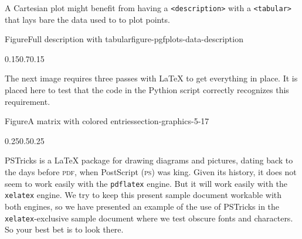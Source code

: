 \documentclass[pdflatex]{sn-jnl}
\theoremstyle{thmstyleone}%
\theoremstyle{thmstyletwo}%
\theoremstyle{thmstylethree}%
\newcommand{\mono}[1]{\texttt{#1}}
\newcommand{\initialism}[1]{\textsc{\MakeLowercase{#1}}}
\numberwithin{equation}{section}
\newcommand{\amp}{&}
\begin{document}
A Cartesian plot might benefit from having a \mono{<description>} with a \mono{<tabular>} that lays bare the data used to to plot points.%
\begin{figureptx}{Figure}{Full description with tabular}{figure-pgfplots-data-description}{}%
\begin{image}{0.15}{0.7}{0.15}{}%
%
\end{image}%
\tcblower
\end{figureptx}%
The next image requires three passes with \LaTeX{} to get everything in place.  It is placed here to test that the code in the Pythion script correctly recognizes this requirement.%
\begin{figureptx}{Figure}{A matrix with colored entries}{section-graphics-5-17}{}%
\begin{image}{0.25}{0.5}{0.25}{}%
\resizebox{\linewidth}{!}{%
    \begin{tikzpicture}
    \node{
        $\begin{bNiceArray}{ccc|cc}[
        code-before={\cellcolor{green!72}{1-1,2-2,3-3}\cellcolor{teal!72}{1-2,2-3,3-4}\cellcolor{yellow!72}{1-3,2-4,3-5}}
        ]
        3 \amp 4 \amp 0 \amp 1 \amp 4 \\
        -2 \amp 3 \amp 1 \amp -2 \amp 3 \\
        0 \amp 2 \amp 1 \amp 0 \amp 2
        \end{bNiceArray}$
    };
\end{tikzpicture}%
}%
\end{image}%
\tcblower
\end{figureptx}%
PSTricks is a \LaTeX{} package for drawing diagrams and pictures, dating back to the days before \initialism{PDF}, when PostScript (\initialism{PS}) was king.  Given its history, it does not seem to work easily with the \mono{pdflatex} engine.  But it will work easily with the \mono{xelatex} engine.  We try to keep this present sample document workable with both engines, so we have presented an example of the use of PSTricks in the \mono{xelatex}-exclusive sample document where we test obscure fonts and characters.  So your best bet is to look there.%
\end{document}
